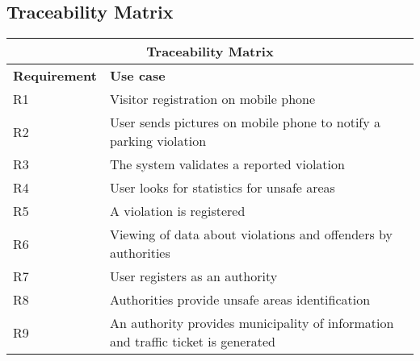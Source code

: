 \subsection{Traceability Matrix}
\begin{center}
    \begin{tabular}{|p{2cm}|p{8cm}|}
        \multicolumn{2}{c}{\textbf{Traceability Matrix}} \\
        \hline
        \textbf{Requirement} & \textbf{Use case} \\
        \hline
        R1 & Visitor registration on mobile phone \\    
        \hline
        R2 & User sends pictures on mobile phone to notify a parking violation \\    
        \hline
        R3 & The system validates a reported violation \\    
        \hline
        R4 & User looks for statistics for unsafe areas \\    
        \hline
        R5 & A violation is registered \\    
        \hline
        R6 & Viewing of data about violations and offenders by authorities \\    
        \hline
        R7 & User registers as an authority \\  
        \hline
        R8 & Authorities provide unsafe areas identification \\    
        \hline
        R9 & An authority provides municipality of information and traffic ticket is generated \\      
        \hline
    \end{tabular}
\end{center}
